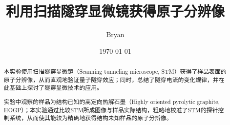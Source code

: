 \documentclass[aps,pre,12pt,preprint,%
	onecolumn,showpacs,showkeys,nofootinbib]{revtex4-1}
\begin{document}
	\title{%
	\texstringonly{\hfil\\[2\baselineskip]}
	\sf\LARGE%
		利用扫描隧穿显微镜获得原子分辨像%
	\texstringonly{\vspace{3ex}}}
	\author{\fangsong\large%
		Bryan%
	\vspace{2mm}}
	\date{\today}

\begin{abstract}
\vspace{10mm}
\begin{spacing}{1.5}\normalsize
\setlength{\parskip}{.3\baselineskip}
%
	本实验使用扫描隧穿显微镜（Scanning tunneling microscope, STM）获得了样品表面的原子分辨像，从而直观地验证量子隧穿效应；同时，总结了隧穿电流的变化规律，并在此基础上探讨了隧穿显微技术的应用。

	实验中观察的样品为结构已知的高定向热解石墨（Highly oriented pyrolytic graphite, HOGP）；本实验通过比较STM所成图像与样品实际结构，粗略地校准了STM的探针控制系统，从而使其能较为精确地获得结构未知样品的原子分辨像。
\end{spacing}
\end{abstract}

\maketitle
\thispagestyle{titlepagestyle}
%
\end{document}
